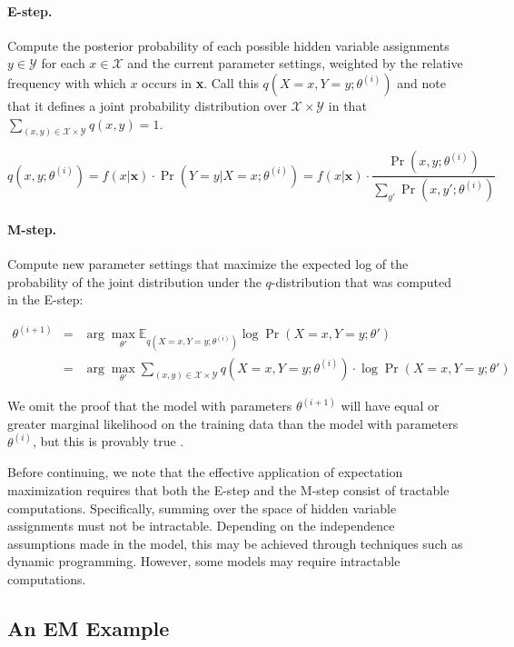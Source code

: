 \paragraph{\bf E-step.}
Compute the posterior probability of each possible hidden variable
assignments $y \in \mathcal{Y}$ for each $x \in \mathcal{X}$ and the
current parameter settings, weighted by the relative frequency with
which $x$ occurs in \textbf{x}.  Call this $q(X=x,Y=y;\theta^{(i)})$
and note that it defines a joint probability distribution over
$\mathcal{X} \times \mathcal{Y}$ in that $\sum_{(x,y) \in \mathcal{X}
  \times \mathcal{Y}} q(x,y) = 1$.

\begin{equation}
q(x,y;\theta^{(i)}) = f(x|\textbf{x}) \cdot \Pr(Y=y|X=x;\theta^{(i)})
= f(x|\textbf{x}) \cdot \frac{\Pr(x,y;\theta^{(i)})}{\sum_{y'}
  \Pr(x,y';\theta^{(i)})}
\end{equation}

\paragraph{\bf M-step.}
Compute new parameter settings that maximize the expected log of the
probability of the joint distribution under the $q$-distribution that
was computed in the E-step:

\begin{eqnarray*}
\theta^{(i+1)} &=& \arg \max_{\theta'} \mathbb{E}_{q(X=x,Y=y;\theta^{(i)})} \log \Pr(X=x,Y=y ; \theta') \\
& = & \arg \max_{\theta'} \sum_{(x,y) \in \mathcal{X} \times \mathcal{Y}} q(X=x,Y=y;\theta^{(i)}) \cdot \log \Pr(X=x,Y=y ; \theta')
\end{eqnarray*}

\noindent We omit the proof that the model with parameters
$\theta^{(i+1)}$ will have equal or greater marginal likelihood on the
training data than the model with parameters $\theta^{(i)}$, but this
is provably true \cite{Jelinek_1997}.

Before continuing, we note that the effective application of
expectation maximization requires that both the E-step and the M-step
consist of tractable computations.  Specifically, summing over the
space of hidden variable assignments must not be intractable.
Depending on the independence assumptions made in the model, this may
be achieved through techniques such as dynamic programming.  However,
some models may require intractable computations.

\subsection{An EM Example}

